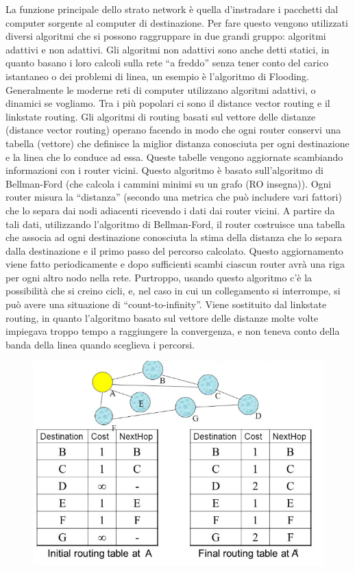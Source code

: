 La funzione principale dello strato network è quella d’instradare i pacchetti dal computer sorgente al computer di destinazione. Per fare questo vengono utilizzati diversi algoritmi che si possono raggruppare in due grandi gruppo: algoritmi adattivi e non adattivi. Gli algoritmi non adattivi sono anche detti statici, in quanto basano i loro calcoli sulla rete “a freddo” senza tener conto del carico istantaneo o dei problemi di linea, un esempio è l’algoritmo di Flooding.
Generalmente le moderne reti di computer utilizzano algoritmi adattivi, o dinamici se vogliamo. Tra i più popolari ci sono il distance vector routing e il linkstate routing.
Gli algoritmi di routing basati sul vettore delle distanze (distance vector routing) operano facendo in modo che ogni router conservi una tabella (vettore) che definisce la miglior distanza conosciuta per ogni destinazione e la linea che lo conduce ad essa. Queste tabelle vengono aggiornate scambiando informazioni con i router vicini.
Questo algoritmo è basato sull’algoritmo di Bellman-Ford (che calcola i cammini minimi su un grafo (RO insegna)).
Ogni router misura la “distanza” (secondo una metrica che può includere vari fattori) che lo separa dai nodi adiacenti ricevendo i dati dai router vicini. A partire da tali dati, utilizzando l’algoritmo di Bellman-Ford, il router costruisce una tabella che associa ad ogni destinazione conosciuta la stima della distanza che lo separa dalla destinazione e il primo passo del percorso calcolato.
Questo aggiornamento viene fatto periodicamente e dopo sufficienti scambi ciascun router avrà una riga per ogni altro nodo nella rete.
Purtroppo, usando questo algoritmo c’è la possibilità che si creino cicli, e, nel caso in cui un collegamento si interrompe, si può avere una situazione di “count-to-infinity”.
Viene sostituito dal linkstate routing, in quanto l’algoritmo basato sul vettore delle distanze molte volte impiegava troppo tempo a raggiungere la convergenza, e non teneva conto della banda della linea quando sceglieva i percorsi.

\begin{figure}[H]
\centering
\includegraphics[scale=0.8]{res/img/33_DistanceVectorRouting.png}
\end{figure} 

